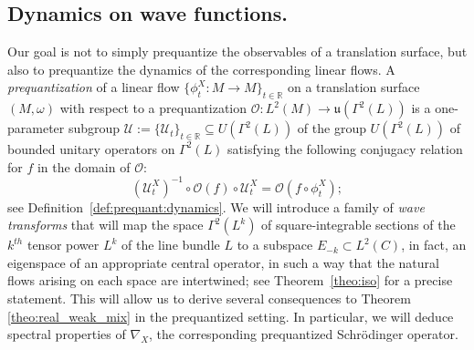 \documentclass{amsart}
\theoremstyle{definition}
\theoremstyle{remark}
\numberwithin{equation}{section}
\newcommand{\<}{{\langle}}
\renewcommand{\>}{{\rangle}}
\begin{document}
\subsection{Dynamics on wave functions.}\label{subsec:wavedyn} Our goal is not to simply prequantize the observables of a translation surface, but also to prequantize the dynamics of the corresponding linear flows. A \textit{prequantization} of a linear flow $\{\phi_t^X \colon M \to M\}_{t \in \mathbb{R}}$ on a translation surface $(M,\omega)$ with respect to a prequantization $\mathcal{O} \colon L^2(M) \to \mathfrak{u}(\Gamma^2(L))$ is a one-parameter subgroup $\mathcal{U} := \{\mathcal{U}_t\}_{t \in \mathbb{R}} \subseteq U(\Gamma^2(L))$ of the group $U(\Gamma^2(L))$ of bounded unitary operators on $\Gamma^2(L)$ satisfying the following conjugacy relation for $f$ in the domain of $\mathcal O$:
$$(\mathcal{U}^X_t)^{-1} \circ \mathcal{O}(f) \circ \mathcal{U}^X_t = \mathcal{O}(f \circ \phi^X_t);$$ see Definition~\ref{def:prequant:dynamics}. We will introduce a family of \textit{wave transforms} that will map the space $\Gamma^2(L^k)$ of square-integrable sections of the $k^{th}$ tensor power $L^k$ of the line bundle $L$ to a subspace $E_{-k} \subset L^2(C)$, in fact, an eigenspace of an appropriate central operator, in such a way that the natural flows arising on each space are intertwined; see Theorem~\ref{theo:iso} for a precise statement. This will allow us to derive several consequences to Theorem \ref{theo:real_weak_mix} in the prequantized setting. In particular, we will deduce spectral properties of $\nabla_X$, the corresponding prequantized Schrödinger operator.
\end{document}
